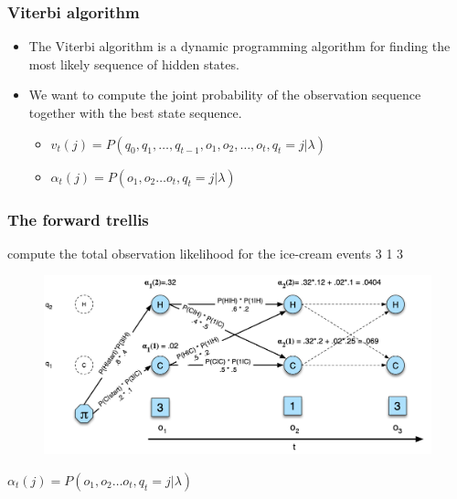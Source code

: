 \documentclass{beamer}
\begin{document}
\begin{frame}
    \frametitle{Viterbi algorithm}
    \begin{itemize}
        \item The Viterbi algorithm is a dynamic programming algorithm for finding the most likely sequence of hidden states.
        \item We want to compute the joint probability of the observation sequence together with the best state sequence.
        \begin{itemize}
            \item     $
            v_{t}(j)=P\left(q_{0}, q_{1}, \ldots, q_{t-1}, o_{1}, o_{2}, \ldots, o_{t}, q_{t}=j | \lambda\right)
            $
            \item $
            \alpha_{t}(j)=P\left(o_{1}, o_{2} \ldots o_{t}, q_{t}=j | \lambda\right)
            $
        \end{itemize}
    \end{itemize}

\end{frame}

\begin{frame}
    \frametitle{The forward trellis}
    compute the total observation likelihood for the ice-cream events 3 1 3
    \begin{figure}[H]
    \centering
    \includegraphics[width=\textwidth]{img/17.png}
    \end{figure}
    $
            \alpha_{t}(j)=P\left(o_{1}, o_{2} \ldots o_{t}, q_{t}=j | \lambda\right)
            $
    \end{frame}
\end{document}
